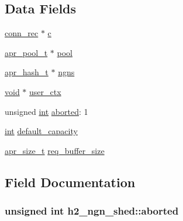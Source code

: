 \subsection*{Data Fields}
\begin{DoxyCompactItemize}
\item 
\hyperlink{structconn__rec}{conn\+\_\+rec} $\ast$ \hyperlink{structh2__ngn__shed_a5d700a43549875730221f09162cb2a25}{c}
\item 
\hyperlink{structapr__pool__t}{apr\+\_\+pool\+\_\+t} $\ast$ \hyperlink{structh2__ngn__shed_a311ac8440bbee51245759028dd5ea110}{pool}
\item 
\hyperlink{structapr__hash__t}{apr\+\_\+hash\+\_\+t} $\ast$ \hyperlink{structh2__ngn__shed_acd125c46e85c3a80bddffe88cdfe55cf}{ngns}
\item 
\hyperlink{group__MOD__ISAPI_gacd6cdbf73df3d9eed42fa493d9b621a6}{void} $\ast$ \hyperlink{structh2__ngn__shed_a1d88471a384d68e232b65ac42f105898}{user\+\_\+ctx}
\item 
unsigned \hyperlink{pcre_8txt_a42dfa4ff673c82d8efe7144098fbc198}{int} \hyperlink{structh2__ngn__shed_ac42cfce26642653a9d2c6a7d1cabf740}{aborted}\+: 1
\item 
\hyperlink{pcre_8txt_a42dfa4ff673c82d8efe7144098fbc198}{int} \hyperlink{structh2__ngn__shed_a894b85c523bfe32849ac3022658f7966}{default\+\_\+capacity}
\item 
\hyperlink{group__apr__platform_gaaa72b2253f6f3032cefea5712a27540e}{apr\+\_\+size\+\_\+t} \hyperlink{structh2__ngn__shed_a2458843bd55235ed2a09a56ee6ea6216}{req\+\_\+buffer\+\_\+size}
\end{DoxyCompactItemize}


\subsection{Field Documentation}
\subsubsection[{\texorpdfstring{aborted}{aborted}}]{\setlength{\rightskip}{0pt plus 5cm}unsigned {\bf int} h2\+\_\+ngn\+\_\+shed\+::aborted}\hypertarget{structh2__ngn__shed_ac42cfce26642653a9d2c6a7d1cabf740}{}\label{structh2__ngn__shed_ac42cfce26642653a9d2c6a7d1cabf740}
